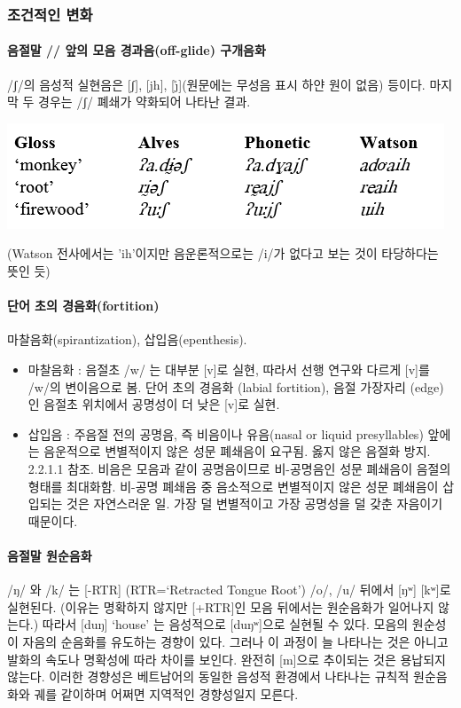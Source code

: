 \subsubsection{조건적인 변화}
\paragraph{음절말 // 앞의 모음 경과음(off-glide) 구개음화} 
/ʃ/의 음성적 실현음은 [ʃ], [jh], [\r{\j}](원문에는 무성음 표시 하얀 원이 없음) 등이다. 마지막 두 경우는 /ʃ/ 폐쇄가 약화되어 나타난 결과.

\includegraphics{Pacoh/src/sh-gloss.png}

(Watson 전사에서는 'ih'이지만 음운론적으로는 /i/가 없다고 보는 것이 타당하다는 뜻인 듯)

\paragraph{단어 초의 경음화(fortition)}
마찰음화(spirantization), 삽입음(epenthesis).
\begin{itemize}
\item 마찰음화 : 음절초 /w/ 는 대부분 [v]로 실현, 따라서 선행 연구와 다르게 [v]를 /w/의 변이음으로 봄. 단어 초의 경음화 (labial fortition), 음절 가장자리 (edge)인 음절초 위치에서 공명성이 더 낮은 [v]로 실현.
\item 삽입음 : 주음절 전의 공명음, 즉 비음이나 유음(nasal or liquid presyllables) 앞에는 음운적으로 변별적이지 않은 성문 폐쇄음이 요구됨. 옳지 않은 음절화 방지. 2.2.1.1 참조. 비음은 모음과 같이 공명음이므로 비-공명음인 성문 폐쇄음이 음절의 형태를 최대화함. 비-공명 폐쇄음 중 음소적으로 변별적이지 않은 성문 폐쇄음이 삽입되는 것은 자연스러운 일. 가장 덜 변별적이고 가장 공명성을 덜 갖춘 자음이기 때문이다.
\end{itemize}

\paragraph{음절말 원순음화}
/ŋ/ 와 /k/ 는 [-RTR] (RTR=‘Retracted Tongue Root’) /o/, /u/ 뒤에서 [ŋʷ] [kʷ]로 실현된다. (이유는 명확하지 않지만 [+RTR]인 모음 뒤에서는 원순음화가 일어나지 않는다.) 따라서 [duŋ] ‘house’ 는 음성적으로 [duŋʷ]으로 실현될 수 있다. 모음의 원순성이 자음의 순음화를 유도하는 경향이 있다. 그러나 이 과정이 늘 나타나는 것은 아니고 발화의 속도나 명확성에 따라 차이를 보인다. 완전히 [m]으로 추이되는 것은 용납되지 않는다. 이러한 경향성은 베트남어의 동일한 음성적 환경에서 나타나는 규칙적 원순음화와 궤를 같이하며 어쩌면 지역적인 경향성일지 모른다.

